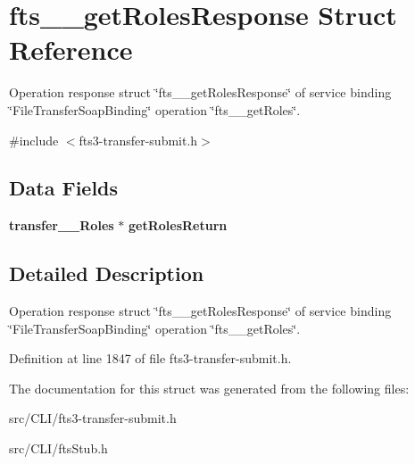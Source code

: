 \section{fts\_\-\_\-getRolesResponse Struct Reference}
\label{structfts____getRolesResponse}


Operation response struct \char`\"{}fts\_\-\_\-getRolesResponse\char`\"{} of service binding \char`\"{}FileTransferSoapBinding\char`\"{} operation \char`\"{}fts\_\-\_\-getRoles\char`\"{}.  




{\ttfamily \#include $<$fts3-\/transfer-\/submit.h$>$}

\subsection*{Data Fields}
\begin{DoxyCompactItemize}
\item 
{\bf transfer\_\-\_\-Roles} $\ast$ {\bfseries getRolesReturn}\label{structfts____getRolesResponse_abfdd5a11ef75eba236c13c9e3ae8d516}

\end{DoxyCompactItemize}


\subsection{Detailed Description}
Operation response struct \char`\"{}fts\_\-\_\-getRolesResponse\char`\"{} of service binding \char`\"{}FileTransferSoapBinding\char`\"{} operation \char`\"{}fts\_\-\_\-getRoles\char`\"{}. 

Definition at line 1847 of file fts3-\/transfer-\/submit.h.



The documentation for this struct was generated from the following files:\begin{DoxyCompactItemize}
\item 
src/CLI/fts3-\/transfer-\/submit.h\item 
src/CLI/ftsStub.h\end{DoxyCompactItemize}
